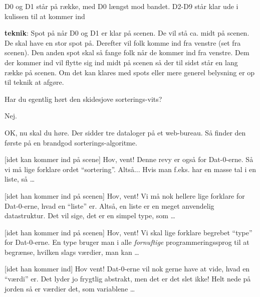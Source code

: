 \documentclass[a4paper,11pt]{article}
\begin{document}
\begin{sketch}

  
  \scene D0 og D1 står på række, med D0 længst mod bandet. D2-D9 står
  klar ude i kulissen til at kommer ind

  
  \scene \textbf{teknik}: Spot på når D0 og D1 er klar på scenen. De
  vil stå ca. midt på scenen. De skal have en stor spot på. Derefter
  vil folk komme ind fra venstre (set fra scenen). Den anden spot skal
  så fange folk når de kommer ind fra venstre. Dem der kommer ind vil
  flytte sig ind midt på scenen så der til sidst står en lang række på
  scenen. Om det kan klares med spots eller mere generel belysning er
  op til teknik at afgøre.
  
   Har du egentlig hørt den skidesjove sorterings-vits?

   Nej.
  
   OK, nu skal du høre. Der sidder tre dataloger på et
  web-bureau.  Så finder den første på en brandgod
  sorterings-algoritme.
  
   [idet kan kommer ind på scene] Hov, vent!  Denne revy er også for Dat-0-erne. Så vi må lige forklare
  ordet ``sortering''. Altså...   Hvis man f.eks. har en masse tal i en
  liste, så \ldots
  
   [idet han kommer ind på scenen] Hov, vent!  Vi må nok
  hellere lige forklare for Dat-0-erne, hvad en ``liste'' er.  Altså, en liste er en meget anvendelig datastruktur.
  Det vil sige, det er en simpel type, som \ldots
  
   [idet han kommer ind på scenen] Hov, vent!  Vi skal lige forklare
  begrebet ``type'' for Dat-0-erne.  En type bruger man i alle {\em
    fornuftige} programmeringssprog til at begrænse, hvilken slags
  værdier, man kan \ldots
  
   [idet han kommer ind] Hov vent!  Dat-0-erne vil nok gerne have at vide, hvad en ``værdi''
  er. Det lyder jo frygtlig abstrakt, men det er det slet ikke!  Helt
  nede på jorden så er værdier det, som variablene \ldots
  

\end{sketch}
\end{document}
